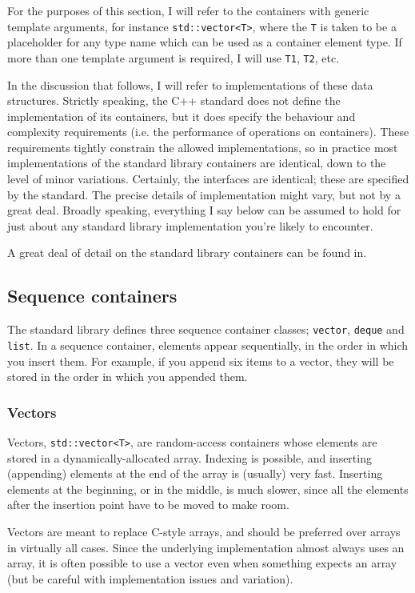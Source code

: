 \documentclass[a4paper]{scrartcl}
\begin{document}
For the purposes of this section, I will refer to the containers with generic template arguments, for instance \verb|std::vector<T>|, where the \verb|T| is taken to be a placeholder for any type name which can be used as a container element type. If more than one template argument is required, I will use \verb|T1|, \verb|T2|, etc.

In the discussion that follows, I will refer to implementations of these data structures. Strictly speaking, the C++ standard does not define the implementation of its containers, but it does specify the behaviour and complexity requirements (i.e. the performance of operations on containers). These requirements tightly constrain the allowed implementations, so in practice most implementations of the standard library containers are identical, down to the level of minor variations. Certainly, the interfaces are identical; these are specified by the standard. The precise details of implementation might vary, but not by a great deal. Broadly speaking, everything I say below can be assumed to hold for just about any standard library implementation you're likely to encounter.

A great deal of detail on the standard library containers can be found in\cite{StandardLibrary}.

\subsection{Sequence containers}\label{sec:containers_sequence}
The standard library defines three sequence container classes; \verb|vector|, \verb|deque| and \verb|list|. In a sequence container, elements appear sequentially, in the order in which you insert them. For example, if you append six items to a vector, they will be stored in the order in which you appended them.

\subsubsection{Vectors}\label{sec:containers_sequence_vector}
Vectors, \verb|std::vector<T>|, are random-access containers whose elements are stored in a dynamically-allocated array. Indexing is possible, and inserting (appending) elements at the end of the array is (usually) very fast. Inserting elements at the beginning, or in the middle, is much slower, since all the elements after the insertion point have to be moved to make room.

Vectors are meant to replace C-style arrays, and should be preferred over arrays in virtually all cases. Since the underlying implementation almost always uses an array, it is often possible to use a vector even when something expects an array (but be careful with implementation issues and variation).
\end{document}
